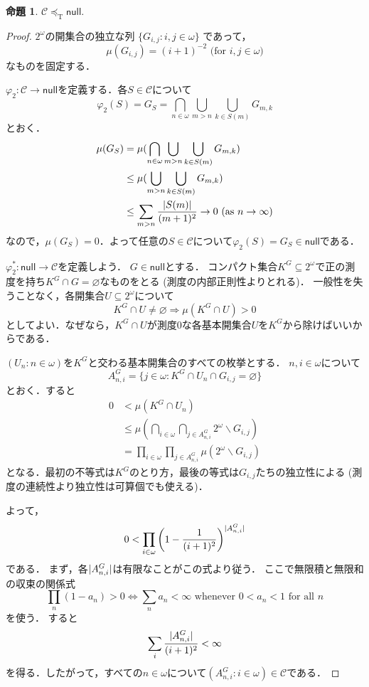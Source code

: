 \documentclass[uplatex,dvipdfmx]{jsarticle}
\newcommand{\scrC}{\mathcal{C}}
\newcommand{\tukeyle}{\preceq_\mathrm{T}}
\newcommand{\nul}{\mathsf{null}}
\DeclarePairedDelimiter\abs{\lvert}{\rvert}
\renewcommand\emptyset{\varnothing}
\renewcommand\subset{\subseteq}
\renewcommand{\setminus}{\smallsetminus}
\theoremstyle{definition}
\newtheorem{prop}[thm]{命題}
\theoremstyle{named}
\begin{document}
	\begin{prop}
		$\scrC \tukeyle \nul$.
	\end{prop}
	\begin{proof}
		$2^\omega$の開集合の独立な列
		$\{ G_{i, j} : i, j \in \omega \}$
		であって，
		\[
		\mu(G_{i,j}) = (i+1)^{-2} \text{ (for $i, j \in \omega$)}
		\]
		なものを固定する．
		
		$\varphi_2: \scrC \to \nul$を定義する．各$S \in \scrC$について
		\[
		\varphi_2(S) = G_S = \bigcap_{n \in \omega} \bigcup_{m > n} \bigcup_{k \in S(m)} G_{m, k}
		\]
		とおく．
		\begin{align*}
		\mu(G_S) &= \mu(\bigcap_{n \in \omega} \bigcup_{m > n} \bigcup_{k \in S(m)} G_{m, k}) \\
		&\le \mu(\bigcup_{m > n} \bigcup_{k \in S(m)} G_{m, k}) \\
		&\le \sum_{m > n} \frac{\abs{S(m)}}{(m+1)^2} \to 0 \text{ (as $n \to \infty$)}
		\end{align*}
		なので，$\mu(G_S) = 0$．よって任意の$S \in \scrC$について$\varphi_2(S) = G_S \in \nul$である．
		
		$\varphi_2^*: \nul \to \scrC$を定義しよう．
		$G \in \nul$とする．
		コンパクト集合$K^G \subset 2^\omega$で正の測度を持ち$K^G \cap G = \emptyset$なものをとる (測度の内部正則性よりとれる)．
		一般性を失うことなく，各開集合$U \subset 2^\omega$について
		\[
		K^G \cap U \ne \emptyset \Rightarrow \mu(K^G \cap U) > 0
		\]
		としてよい．なぜなら，$K^G \cap U$が測度$0$な各基本開集合$U$を$K^G$から除けばいいからである．
		
		$(U_n : n \in \omega)$を$K^G$と交わる基本開集合のすべての枚挙とする．
		$n, i \in \omega$について
		\[
		A^G_{n, i} = \{ j \in \omega : K^G \cap U_n \cap G_{i, j} = \emptyset \}
		\]
		とおく．すると
		\begin{align*}
		0 &< \mu(K^G \cap U_n) \\
		&\le \mu(\bigcap_{i \in \omega} \bigcap_{j \in A^G_{n, i}} 2^\omega \setminus G_{i, j}) \\
		&= \prod_{i \in \omega} \prod_{j \in A^G_{n, i}} \mu(2^\omega \setminus G_{i, j})
		\end{align*}
		となる．最初の不等式は$K^G$のとり方，最後の等式は$G_{i, j}$たちの独立性による (測度の連続性より独立性は可算個でも使える)．
		
		よって，
		\[
		0 < \prod_{i \in \omega} \left(1 - \frac{1}{(i+1)^2}\right)^{\abs{A^G_{n, i}}}
		\]
		である．
		まず，各$\abs{A^G_{n, i}}$は有限なことがこの式より従う．
		ここで無限積と無限和の収束の関係式
		\[
		\prod_n (1 - a_n) > 0 \iff \sum_n a_n < \infty \text{ whenever $0 < a_n < 1$ for all $n$}
		\]
		を使う．
		すると
		\[
		\sum_i \frac{\abs{A^G_{n, i}}}{(i+1)^2} < \infty
		\]
		を得る．したがって，すべての$n \in \omega$について$(A^G_{n, i} : i \in \omega) \in \scrC$である．
		

\end{proof}
\end{document}
